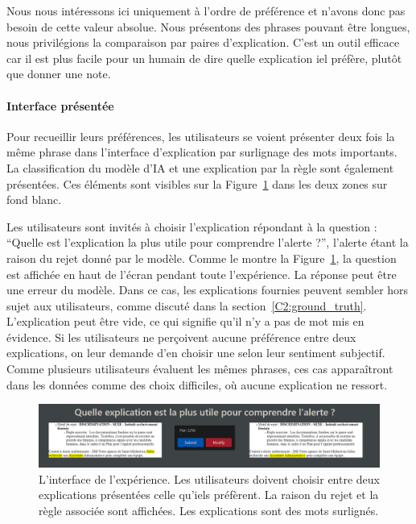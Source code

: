 Nous nous intéressons ici uniquement à l'ordre de préférence et n'avons donc pas besoin de cette valeur absolue. Nous présentons des phrases pouvant être longues, nous privilégions la comparaison par paires d'explication.
C'est un outil efficace car il est plus facile pour un humain de dire quelle explication iel préfère, plutôt que donner une note.

\paragraph{Interface présentée}
Pour recueillir leurs préférences, les utilisateurs se voient présenter deux fois la même phrase dans l'interface d'explication par surlignage des mots importants. La classification du modèle d'IA et une explication par la règle sont également présentées. Ces éléments sont visibles sur la Figure~\ref{fig:expe_ui} dans les deux zones sur fond blanc.

Les utilisateurs sont invités à choisir l'explication répondant à la question : ``Quelle est l'explication la plus utile pour comprendre l'alerte ?'', l'alerte étant la raison du rejet donné par le modèle. Comme le montre la Figure~\ref{fig:expe_ui}, la question est affichée en haut de l'écran pendant toute l'expérience.
La réponse peut être une erreur du modèle. Dans ce cas, les explications fournies peuvent sembler hors sujet aux utilisateurs, comme discuté dans la section~\ref{C2:ground_truth}.
L'explication peut être vide, ce qui signifie qu'il n'y a pas de mot mis en évidence. Si les utilisateurs ne perçoivent aucune préférence entre deux explications, on leur demande d'en choisir une selon leur sentiment subjectif. Comme plusieurs utilisateurs évaluent les mêmes phrases, ces cas apparaîtront dans les données comme des choix difficiles, où aucune explication ne ressort.

\begin{figure}[h!tpb]
  \setlength{\belowcaptionskip}{-20pt}
  \begin{center}
    \includegraphics[width=\textwidth]{S3-Comparaison_de_methodes/figures/user_experiment_interface.png}
    \caption{L'interface de l'expérience. Les utilisateurs doivent choisir entre deux explications présentées celle qu'iels préfèrent. La raison du rejet et la règle associée sont affichées. Les explications sont des mots surlignés.}\label{fig:expe_ui}
  \end{center}
\end{figure}

